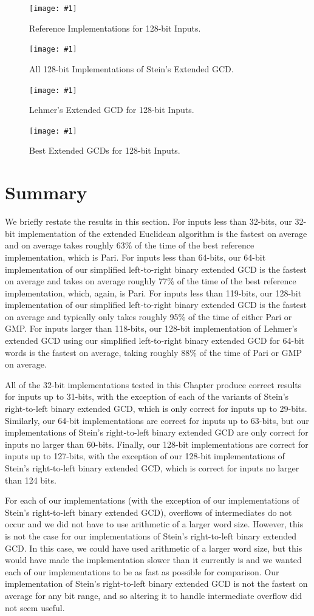 \documentclass{ucalgthes1}
\theoremstyle{definition}
\newcommand{\mygraph}[3]{
	\begin{figure}[htb]
	\centering
	\texttt{[image: \#1]}
	\caption{#3}
	\label{#2}
	\end{figure}
}
\begin{document}
\mygraph{reference-impl-128}{fig:gcdRef128}{Reference Implementations for 128-bit Inputs.}
\mygraph{steins-128}{fig:gcdSteins128}{All 128-bit Implementations of Stein's Extended GCD.}
\mygraph{lehmer-128}{fig:gcdLehmer128}{Lehmer's Extended GCD for 128-bit Inputs.}
\mygraph{best-128}{fig:gcdBest128}{Best Extended GCDs for 128-bit Inputs.}

\clearpage


\section{Summary}

We briefly restate the results in this section.  For inputs less than 32-bits, our 32-bit implementation of the extended Euclidean algorithm is the fastest on average and on average takes roughly 63\% of the time of the best reference implementation, which is Pari.  For inputs less than 64-bits, our 64-bit implementation of our simplified left-to-right binary extended GCD is the fastest on average and takes on average roughly 77\% of the time of the best reference implementation, which, again, is Pari.  For inputs less than 119-bits, our 128-bit implementation of our simplified left-to-right binary extended GCD is the fastest on average and typically only takes roughly 95\% of the time of either Pari or GMP.  For inputs larger than 118-bits, our 128-bit implementation of Lehmer's extended GCD using our simplified left-to-right binary extended GCD for 64-bit words is the fastest on average, taking roughly 88\% of the time of Pari or GMP on average.

All of the 32-bit implementations tested in this Chapter produce correct results for inputs up to 31-bits, with the exception of each of the variants of Stein's right-to-left binary extended GCD, which is only correct for inputs up to 29-bits.  Similarly, our 64-bit implementations are correct for inputs up to 63-bits, but our implementations of Stein's right-to-left binary extended GCD are only correct for inputs no larger than 60-bits.  Finally, our 128-bit implementations are correct for inputs up to 127-bits, with the exception of our 128-bit implementations of Stein's right-to-left binary extended GCD, which is correct for inputs no larger than 124 bits.

For each of our implementations (with the exception of our implementations of Stein's right-to-left binary extended GCD), overflows of intermediates do not occur and we did not have to use arithmetic of a larger word size.  However, this is not the case for our implementations of Stein's right-to-left binary extended GCD.  In this case, we could have used arithmetic of a larger word size, but this would have made the implementation slower than it currently is and we wanted each of our implementations to be as fast as possible for comparison.  Our implementation of Stein's right-to-left binary extended GCD is not the fastest on average for any bit range, and so altering it to handle intermediate overflow did not seem useful.
\end{document}
